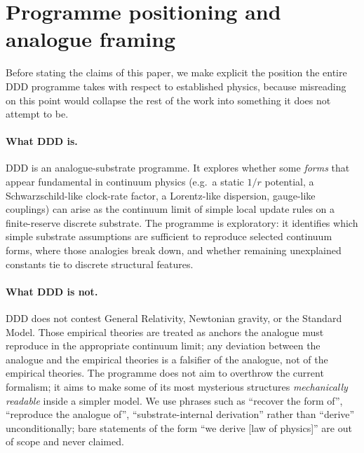 \documentclass[11pt,a4paper]{article}
\begin{document}
\noindent{}
\bigskip


\section{Programme positioning and analogue framing}
\label{sec:framing}

Before stating the claims of this paper, we make explicit the
position the entire DDD programme takes with respect to
established physics, because misreading on this point would
collapse the rest of the work into something it does not
attempt to be.

\paragraph{What DDD is.} DDD is an analogue-substrate
programme. It explores whether some \emph{forms} that appear
fundamental in continuum physics (e.g.\ a static $1/r$
potential, a Schwarzschild-like clock-rate factor, a
Lorentz-like dispersion, gauge-like couplings) can arise as the
continuum limit of simple local update rules on a finite-reserve
discrete substrate. The programme is exploratory: it identifies
which simple substrate assumptions are sufficient to reproduce
selected continuum forms, where those analogies break down, and
whether remaining unexplained constants tie to discrete
structural features.

\paragraph{What DDD is not.} DDD does not contest General
Relativity, Newtonian gravity, or the Standard Model. Those
empirical theories are treated as anchors the analogue must
reproduce in the appropriate continuum limit; any deviation
between the analogue and the empirical theories is a falsifier
of the analogue, not of the empirical theories. The programme
does not aim to overthrow the current formalism; it aims to
make some of its most mysterious structures \emph{mechanically
readable} inside a simpler model. We use phrases such as
``recover the form of'', ``reproduce the analogue of'',
``substrate-internal derivation'' rather than ``derive''
unconditionally; bare statements of the form ``we derive
[law of physics]'' are out of scope and never claimed.
\end{document}
